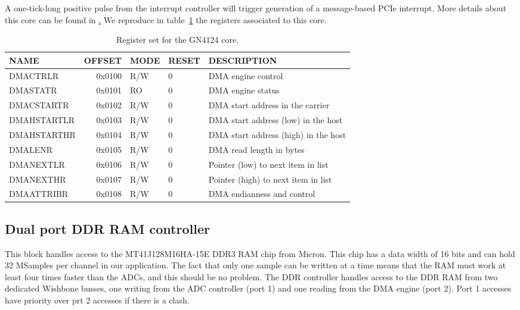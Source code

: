 \documentclass{article}
\begin{document}
A one-tick-long positive pulse from the interrupt controller will trigger generation of a message-based PCIe interrupt. More details about this core can be found in \href{http://www.ohwr.org/projects/gn4124-core/wiki}. We reproduce in table~\ref{tab:gn4124_core} the registers associated to this core. 

\begin{table}[htbp]
  \centering
  \begin{tabularx}{\textwidth}{|l|r|l|l|X|}
    \hline
    \textbf{NAME} & \textbf{OFFSET} & \textbf{MODE} & \textbf{RESET} & \textbf{DESCRIPTION} \\
    \hline
    \hline
    DMACTRLR & 0x0100 & R/W & 0 & DMA engine control\\
    \hline
    DMASTATR & 0x0101 & RO & 0 & DMA engine status\\
    \hline
    DMACSTARTR & 0x0102 & R/W & 0 & DMA start address in the carrier\\
    \hline
    DMAHSTARTLR & 0x0103 & R/W & 0 & DMA start address (low) in the host\\
    \hline
    DMAHSTARTHR & 0x0104 & R/W & 0 & DMA start address (high) in the host\\
    \hline
    DMALENR & 0x0105 & R/W & 0 & DMA read length in bytes\\
    \hline
    DMANEXTLR & 0x0106 & R/W & 0 & Pointer (low) to next item in list\\
    \hline
    DMANEXTHR & 0x0107 & R/W & 0 & Pointer (high) to next item in list\\
    \hline
    DMAATTRIBR & 0x0108 & R/W & 0 & DMA endianness and control\\
    \hline
  \end{tabularx}
  \caption{Register set for the GN4124 core.}
  \label{tab:gn4124_core}
\end{table}

\subsection{Dual port DDR RAM controller}
This block handles access to the MT41J128M16HA-15E DDR3 RAM chip from Micron. This chip has a data width of 16 bits and can hold 32 MSamples per channel in our application. The fact that only one sample can be written at a time means that the RAM must work at least four times faster than the ADCs, and this should be no problem. The DDR controller handles access to the DDR RAM from two dedicated Wishbone busses, one writing from the ADC controller (port 1) and one reading from the DMA engine (port 2). Port 1 accesses have priority over prt 2 accesses if there is a clash.
\end{document}
